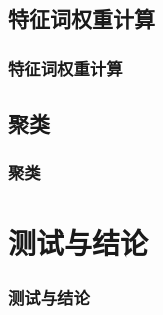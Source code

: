 \documentclass[CJK, table]{beamer}
\begin{document}
\begin{CJK}{UTF8}{gbsn}
\subsection{特征词权重计算}
\begin{frame}
  \frametitle{特征词权重计算}
\end{frame}

\subsection{聚类}
\begin{frame}
  \frametitle{聚类}
\end{frame}

\section{测试与结论}
\begin{frame}
  \frametitle{测试与结论}
\end{frame}
\end{CJK}
\end{document}
